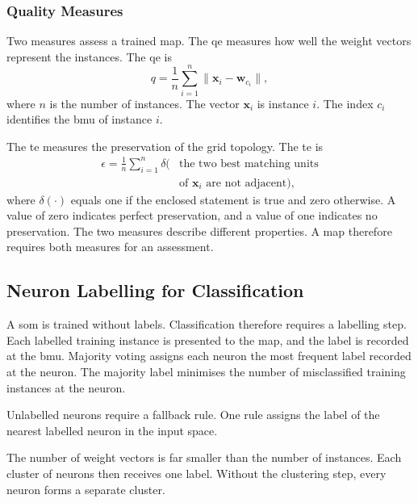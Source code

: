 \documentclass[conference]{IEEEtran}
\newcommand{\vect}[1]{\mathbf{#1}}
\begin{document}
\subsubsection{Quality Measures}

Two measures assess a trained map.
The \gls{qe} measures how well the weight vectors represent the instances.
The \gls{qe} is
\begin{equation}
q = \frac{1}{n} \sum_{i=1}^{n} \lVert \vect{x}_i - \vect{w}_{c_i} \rVert ,
\label{eq:qe}
\end{equation}
where $n$ is the number of instances.
The vector $\vect{x}_i$ is instance $i$.
The index $c_i$ identifies the \gls{bmu} of instance $i$.

The \gls{te} measures the preservation of the grid topology.
The \gls{te} is
\begin{equation}
\begin{split}
\epsilon = \frac{1}{n} \sum_{i=1}^{n} \delta\bigl( & \text{the two best matching units} \\
& \text{of } \vect{x}_i \text{ are not adjacent} \bigr) ,
\end{split}
\label{eq:te}
\end{equation}
where $\delta(\cdot)$ equals one if the enclosed statement is true and zero otherwise.
A value of zero indicates perfect preservation, and a value of one indicates no preservation.
The two measures describe different properties.
A map therefore requires both measures for an assessment.

\subsection{Neuron Labelling for Classification}
\label{sub:labelling}

A \gls{som} is trained without labels.
Classification therefore requires a labelling step.
Each labelled training instance is presented to the map, and the label is recorded at the \gls{bmu}.
Majority voting assigns each neuron the most frequent label recorded at the neuron.
The majority label minimises the number of misclassified training instances at the neuron.

Unlabelled neurons require a fallback rule.
One rule assigns the label of the nearest labelled neuron in the input space.

The number of weight vectors is far smaller than the number of instances.
Each cluster of neurons then receives one label.
Without the clustering step, every neuron forms a separate cluster.
\end{document}
